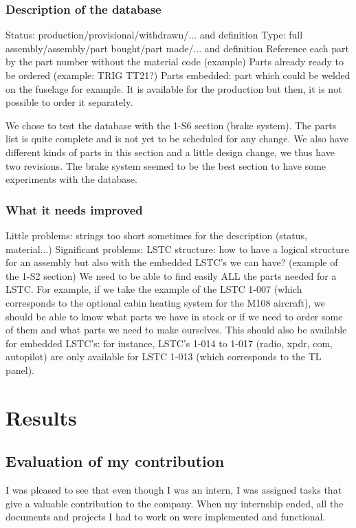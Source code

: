 \documentclass[11pt,a4paper]{article}
\begin{document}
\subsubsection{Description of the database}
Status: production/provisional/withdrawn/... and definition
Type: full assembly/assembly/part bought/part made/... and definition
Reference each part by the part number without the material code (example)
Parts already ready to be ordered (example: TRIG TT21?)
Parts embedded: part which could be welded on the fuselage for example. It is available for the production but then, it is not possible to order it separately.

We chose to test the database with the 1-S6 section (brake system). The parts list is quite complete and is not yet to be scheduled for any change. We also have different kinds of parts in this section and a little design change, we thus have two revisions. The brake system seemed to be the best section to have some experiments with the database.

\subsubsection{What it needs improved}
Little problems: strings too short sometimes for the description (status, material...)
Significant problems: LSTC structure: how to have a logical structure for an assembly but also with the embedded LSTC's we can have? (example of the 1-S2 section)
We need to be able to find easily ALL the parts needed for a LSTC. For example, if we take the example of the LSTC 1-007 (which corresponds to the optional cabin heating system for the M108 aircraft), we should be able to know what parts we have in stock or if we need to order some of them and what parts we need to make ourselves.
This should also be available for embedded LSTC's: for instance, LSTC's 1-014 to 1-017 (radio, xpdr, com, autopilot) are only available for LSTC 1-013 (which corresponds to the TL panel).


\newpage

\section{Results}
\subsection{Evaluation of my contribution}
 I was pleased to see that even though I was an intern, I was assigned tasks that give a valuable contribution to the company. When my internship ended, all the documents and projects I had to work on were implemented and functional.
\end{document}
